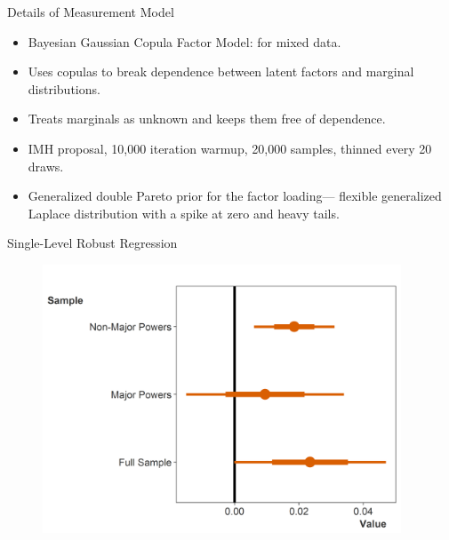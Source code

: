 \documentclass{beamer}
\begin{document}

\begin{frame}{Details of Measurement Model}

\begin{itemize}
\item Bayesian Gaussian Copula Factor Model: for mixed data. 
\item Uses copulas to break dependence between latent factors and marginal distributions. 
\item Treats marginals as unknown and keeps them free of dependence. 
\item IMH proposal, 10,000 iteration warmup, 20,000 samples, thinned every 20 draws. 
\item Generalized double Pareto prior for the factor loading--- flexible generalized Laplace distribution with a spike at zero and heavy tails. 
\end{itemize} 


\end{frame}



\begin{frame}{Single-Level Robust Regression}

\begin{figure}[htbp]
	\centering
		\includegraphics[width=0.95\textwidth]{robust-reg-coef.png}
	\label{fig:robust-reg-coef}
\end{figure}



\end{frame}



\end{document}
